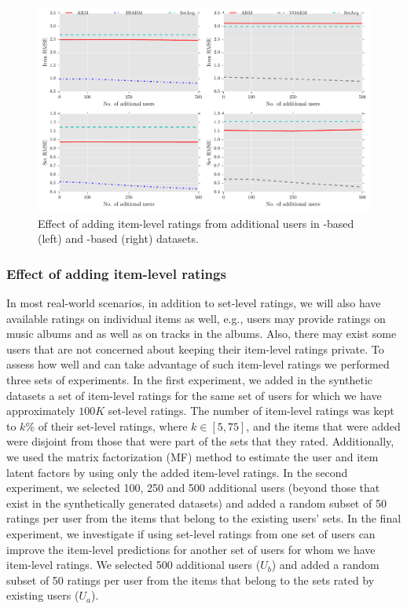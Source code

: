 \begin{figure}[t]
  \centerline{\includegraphics[scale=0.57]{figures/add_users_syn.pdf}}
  \caption{Effect of adding item-level ratings from additional users in \ES-based (left) and \VO-based
  (right) datasets.}
  \label{fig:syn_add_users}
\end{figure}



\subsubsection{Effect of adding item-level ratings}

In most real-world scenarios, in addition to set-level ratings, we will also have
available ratings on individual items as well, e.g., users may provide ratings
on music albums and as well as on tracks in the albums. Also, there may exist
some users that are not concerned about keeping their item-level ratings
private.
To assess how well \ES and \VO  can take advantage of such item-level ratings
we performed three sets of experiments. In the first experiment, we added in the
synthetic datasets a set of item-level ratings for the same set of
users for which we have approximately $100K$ set-level ratings. The number of item-level ratings was
kept to $k$\% of their set-level ratings, where $k \in [5, 75]$, and the items that were added were disjoint
from those that were part of the sets that they rated. Additionally, we used the
matrix factorization (MF) method to estimate the user and item latent
factors by using only the added item-level ratings.
%
In the second experiment, we
selected 100, 250 and 500 additional users (beyond those that exist in the synthetically generated 
datasets) and added a random subset of 50 ratings per user from
the items that belong to the existing users' sets. 
%
In the final experiment, we investigate if using set-level ratings
from one set of users can improve the item-level predictions for another set of
users for whom we have item-level ratings. We selected 500 additional users
($U_b$) and added a random subset of 50  ratings per user from the items that belong to
the sets rated by existing users ($U_a$). 

